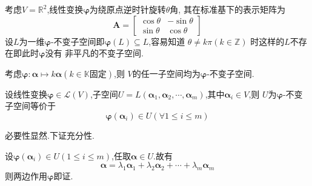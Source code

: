 \begin{brown}
\begin{example}
    考虑$V=\mathbb{R}^2$,线性变换$\bm{\varphi}$为绕原点逆时针旋转$\theta$角,
    其在标准基下的表示矩阵为
    \[
    \bm{A}=\begin{bmatrix}
        \cos \theta&-\sin \theta\\
        \sin \theta&\cos \theta
    \end{bmatrix}
    \]
    设$L$为一维$\bm{\varphi}$-不变子空间即$\bm{\varphi}\left(
        L
    \right)\subseteq L$,容易知道
    $\theta \neq k\pi\left(k\in \mathbb{Z}\right)$
    时这样的$L$不存在即此时$\bm{\varphi}$没有
    非平凡的不变子空间.
\end{example}
\end{brown}
\begin{brown}
\begin{example}
    考虑$\bm{\varphi}:\bm{\alpha}\longmapsto k\bm{\alpha}
    \left(k\in \mathbb{K}\text{固定}\right)$,则
    $V$的任一子空间均为$\bm{\varphi}$-不变子空间.
\end{example}
\end{brown}
\begin{green}
\begin{lemma}[张成的子空间为不变子空间]\label{lem:张成的子空间为不变子空间}
    设线性变换$\bm{\varphi}\in \mathcal{L}\left(V
    \right)$,子空间$U=L\left(\bm{\alpha}_1,\bm{\alpha}_2,\cdots
    ,\bm{\alpha}_m\right)$,其中$\bm{\alpha}_i\in V$,则
    $U$为$\bm{\varphi}$-不变子空间等价于
    \[
    \bm{\varphi}\left(\bm{\alpha}_i\right)
    \in U\left(\forall 1 \leqslant i \leqslant m \right)
    \]
\end{lemma}
\begin{Proof}
必要性显然.下证充分性.

设$\bm{\varphi}\left(\bm{\alpha}_i\right)\in U\left(1\leqslant i\leqslant m\right)$,任取$\bm{\alpha}
\in U.$故有
\[
\bm{\alpha}=\lambda_1\bm{\alpha}_1+\lambda_2\bm{\alpha}_2+\cdots+\lambda_m\bm{\alpha}_m
\]
则两边作用$\bm{\varphi}$即证.
\end{Proof}
\end{green}
